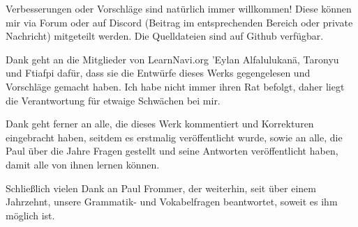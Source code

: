 Verbesserungen oder Vorschläge sind natürlich immer willkommen! Diese können mir via Forum oder auf Discord (Beitrag im entsprechenden Bereich oder private Nachricht) mitgeteilt werden. Die Quelldateien sind auf Github verfügbar.

\vfill
Dank geht an die Mitglieder von LearnNavi.org 'Eylan Alfalulukanä, Taronyu und Ftiafpi dafür, dass sie die Entwürfe dieses Werks gegengelesen und Vorschläge gemacht haben. Ich habe nicht immer ihren Rat befolgt, daher liegt die Verantwortung für etwaige Schwächen bei mir.

Dank geht ferner an alle, die dieses Werk kommentiert und Korrekturen eingebracht haben, seitdem es erstmalig veröffentlicht wurde, sowie an alle, die Paul über die Jahre Fragen gestellt und seine Antworten veröffentlicht haben, damit alle von ihnen lernen können.

Schließlich vielen Dank an Paul Frommer, der weiterhin, seit über einem Jahrzehnt, unsere Grammatik- und Vokabelfragen beantwortet, soweit es ihm möglich ist.

\bigskip